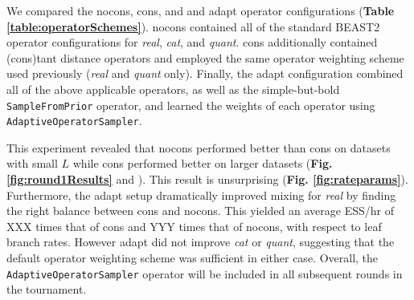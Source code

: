 \documentclass[10pt,letterpaper]{article}
\begin{document}
We compared the nocons, cons, and and adapt operator configurations (\textbf{Table \ref{table:operatorSchemes}}).
nocons contained all of the standard BEAST2 operator configurations for \textit{real}, \textit{cat}, and \textit{quant}.
cons additionally contained (cons)tant distance operators and employed the same operator weighting scheme used previously \cite{zhang2020improving} (\textit{real} and \textit{quant} only). 
Finally, the adapt configuration combined all of the above applicable operators, as well as the simple-but-bold \texttt{SampleFromPrior} operator, and learned the weights of each operator using  \texttt{AdaptiveOperatorSampler}.



This experiment revealed that nocons performed better than cons on datasets with small $L$ while cons performed better on larger datasets (\textbf{Fig. \ref{fig:round1Results}} and \textbf{}). 
This result is unsurprising (\textbf{Fig. \ref{fig:rateparams}}).
Furthermore, the adapt setup dramatically improved mixing for \textit{real} by finding the right balance between cons and nocons.
This yielded an average ESS/hr of XXX times that of cons and YYY times that of nocons, with respect to leaf branch rates.   
However adapt did not improve \textit{cat} or \textit{quant}, suggesting that the default operator weighting scheme was sufficient in either case.
Overall, the \texttt{AdaptiveOperatorSampler} operator will be included in all subsequent rounds in the tournament. 
\end{document}
